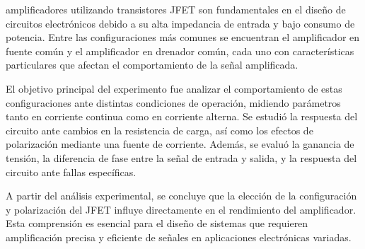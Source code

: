 \documentclass[journal]{IEEEtran}
\begin{document}
amplificadores utilizando transistores JFET son fundamentales en el diseño de circuitos electrónicos debido a su alta impedancia de entrada y bajo consumo de potencia. Entre las configuraciones más comunes se encuentran el amplificador en fuente común y el amplificador en drenador común, cada uno con características particulares que afectan el comportamiento de la señal amplificada.
\par El objetivo principal del experimento fue analizar el comportamiento de estas configuraciones ante distintas condiciones de operación, midiendo parámetros tanto en corriente continua como en corriente alterna. Se estudió la respuesta del circuito ante cambios en la resistencia de carga, así como los efectos de polarización mediante una fuente de corriente. Además, se evaluó la ganancia de tensión, la diferencia de fase entre la señal de entrada y salida, y la respuesta del circuito ante fallas específicas.
\par A partir del análisis experimental, se concluye que la elección de la configuración y polarización del JFET influye directamente en el rendimiento del amplificador. Esta comprensión es esencial para el diseño de sistemas que requieren amplificación precisa y eficiente de señales en aplicaciones electrónicas variadas.
\end{document}
